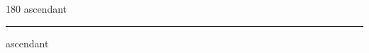 
\begin{frame}
\begin{center}
\begin{turn}{180}
{\fontsize{2.5cm}{1em}\selectfont ascendant}
\end{turn}
\vspace{1em}\par  
\hrule
\vspace{1em}\par  
{\fontsize{2.5cm}{1em}\selectfont ascendant}
\end{center}
\end{frame}
